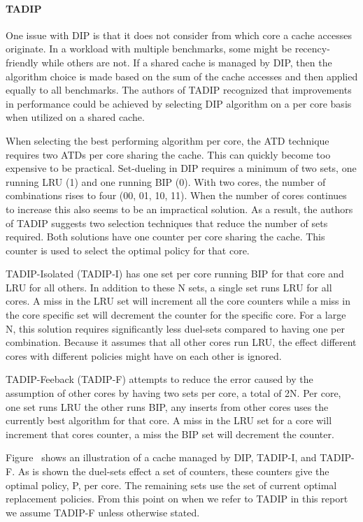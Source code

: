 \paragraph{TADIP}

One issue with DIP is that it does not consider from which core a cache accesses originate.
In a workload with multiple benchmarks, some might be recency-friendly while others are not. 
If a shared cache is managed by DIP, then the algorithm choice is made based on the sum of the cache accesses and then applied equally to all benchmarks.
The authors of TADIP recognized that improvements in performance could be achieved by selecting DIP algorithm on a per core basis when utilized on a shared cache.

When selecting the best performing algorithm per core, the ATD technique requires two ATDs per core sharing the cache. 
This can quickly become too expensive to be practical.
Set-dueling in DIP requires a minimum of two sets, one running LRU (1) and one running BIP (0). 
With two cores, the number of combinations rises to four (00, 01, 10, 11).
When the number of cores continues to increase this also seems to be an impractical solution.
As a result, the authors of TADIP suggests two selection techniques that reduce the number of sets required. 
Both solutions have one counter per core sharing the cache.
This counter is used to select the optimal policy for that core.

TADIP-Isolated (TADIP-I) has one set per core running BIP for that core and LRU for all others.
In addition to these N sets, a single set runs LRU for all cores. 
A miss in the LRU set will increment all the core counters while a miss in the core specific set will decrement the counter for the specific core.
For a large N, this solution requires significantly less duel-sets compared to having one per combination. 
Because it assumes that all other cores run LRU, the effect different cores with different policies might have on each other is ignored.

TADIP-Feeback (TADIP-F) attempts to reduce the error caused by the assumption of other cores by having two sets per core, a total of 2N.
Per core, one set runs LRU the other runs BIP, any inserts from other cores uses the currently best algorithm for that core.
A miss in the LRU set for a core will increment that cores counter, a miss the BIP set will decrement the counter.


Figure~ shows an illustration of a cache managed by DIP, TADIP-I, and TADIP-F. 
As is shown the duel-sets effect a set of counters, these counters give the optimal policy, P, per core. 
The remaining sets use the set of current optimal replacement policies.
From this point on when we refer to TADIP in this report we assume TADIP-F unless otherwise stated.

